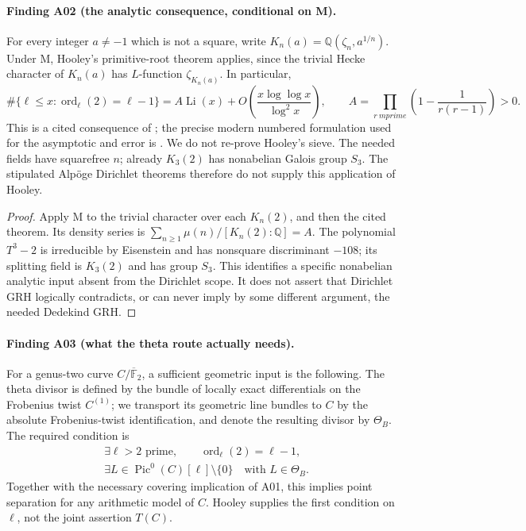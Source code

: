 \documentclass[11pt,a4paper]{article}
\begin{document}
\paragraph{Finding A02 (the analytic consequence, conditional on M).}
For every integer $a\ne-1$ which is not a square, write
$K_n(a)=\mathbb Q(\zeta_n,a^{1/n})$. Under M, Hooley's primitive-root
theorem applies, since the trivial Hecke character of $K_n(a)$ has
$L$-function $\zeta_{K_n(a)}$. In particular,
\[
 \#\{\ell\le x:\operatorname{ord}_{\ell}(2)=\ell-1\}
 = A\operatorname{Li}(x)
   +O\!\left(\frac{x\log\log x}{\log^2x}\right),\qquad
 A=\prod_{r\ {
m prime}}\left(1-\frac1{r(r-1)}\right)>0.
 \tag{A02}
\]
This is a cited consequence of \cite[\S7, concluding theorem]{Hooley}; the precise modern
numbered formulation used for the asymptotic and error is
\cite[Theorem~1.1, specialized to $a=2$]{FanPollack}. We do not re-prove
Hooley's sieve. The needed fields have squarefree $n$; already $K_3(2)$
has nonabelian Galois group $S_3$. The stipulated Alp\"oge Dirichlet
theorems therefore do not supply this application of Hooley.

\begin{proof}
Apply M to the trivial character over each $K_n(2)$, and then the
cited theorem. Its density series is
$\sum_{n\ge1}\mu(n)/[K_n(2):\mathbb Q]=A$. The polynomial $T^3-2$
is irreducible by Eisenstein and has nonsquare discriminant $-108$;
its splitting field is $K_3(2)$ and has group $S_3$. This identifies
a specific nonabelian analytic input absent from the Dirichlet scope.
It does not assert that Dirichlet GRH logically contradicts, or can
never imply by some different argument, the needed Dedekind GRH.
\end{proof}

\paragraph{Finding A03 (what the theta route actually needs).}
For a genus-two curve $C/\overline{\mathbb F}_2$, a sufficient geometric
input is the following. The theta divisor is defined by the bundle of
locally exact differentials on the Frobenius twist $C^{(1)}$; we
transport its geometric line bundles to $C$ by the absolute
Frobenius-twist identification, and denote the resulting divisor by
$\Theta_B$. The required condition is
\[
 \begin{gathered}
 \exists\ell>2\text{ prime},\qquad \operatorname{ord}_{\ell}(2)=\ell-1,\\
 \exists L\in\operatorname{Pic}^0(C)[\ell]\setminus\{0\}
                  \quad\text{with }L\in\Theta_B.
 \end{gathered}
 \tag{T(C)}
\]
Together with the necessary covering implication of A01, this implies
point separation for any arithmetic model of $C$. Hooley supplies the
first condition on $\ell$, not the joint assertion $T(C)$.
\end{document}
